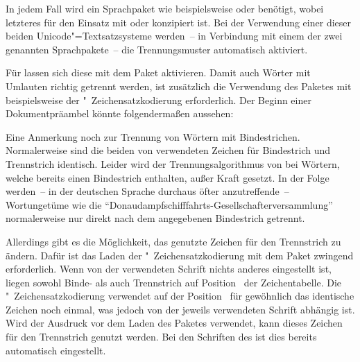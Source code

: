 In jedem Fall wird ein Sprachpaket wie beispielsweise  oder
 benötigt, wobei letzteres für den Einsatz mit
 oder  konzipiert ist. Bei der Verwendung
einer dieser beiden Unicode"=Textsatzsysteme werden~-- in Verbindung mit einem 
der zwei genannten Sprachpakete~-- die Trennungsmuster automatisch aktiviert. 

Für  lassen sich diese mit dem Paket 
aktivieren. Damit auch Wörter mit Umlauten richtig getrennt werden, ist
zusätzlich die Verwendung des Paketes  mit beispielsweise der
"~Zeichensatzkodierung erforderlich. Der Beginn einer 
Dokumentpräambel könnte folgendermaßen aussehen:
%
\begin{quoting}[rightmargin=0pt]
\end{quoting}
%
Eine Anmerkung noch zur Trennung von Wörtern mit Bindestrichen. Normalerweise 
sind die beiden von  verwendeten Zeichen für Bindestrich und 
Trennstrich identisch. Leider wird der Trennungsalgorithmus von  
bei Wörtern, welche bereits einen Bindestrich enthalten, außer Kraft gesetzt. 
In der Folge werden~-- in der deutschen Sprache durchaus öfter anzutreffende~-- 
Wortungetüme wie die \enquote{Donaudampfschifffahrts-Gesellschafterversammlung} 
normalerweise nur direkt nach dem angegebenen Bindestrich getrennt. 

Allerdings gibt es die Möglichkeit, das genutzte Zeichen für den Trennstrich 
zu ändern. Dafür ist das Laden der "~Zeichensatzkodierung mit dem 
Paket  zwingend erforderlich. Wenn von der verwendeten Schrift 
nichts anderes eingestellt ist, liegen sowohl Binde- als auch Trennstrich auf 
Position~ der Zeichentabelle. Die "~Zeichensatzkodierung 
verwendet auf der Position~ für gewöhnlich das identische Zeichen 
noch einmal, was jedoch von der jeweils verwendeten Schrift abhängig ist. Wird 
der Ausdruck  vor dem Laden des Paketes 
 verwendet, kann dieses Zeichen für den Trennstrich genutzt 
werden. Bei den Schriften des \TUDCDs ist dies bereits automatisch eingestellt.


